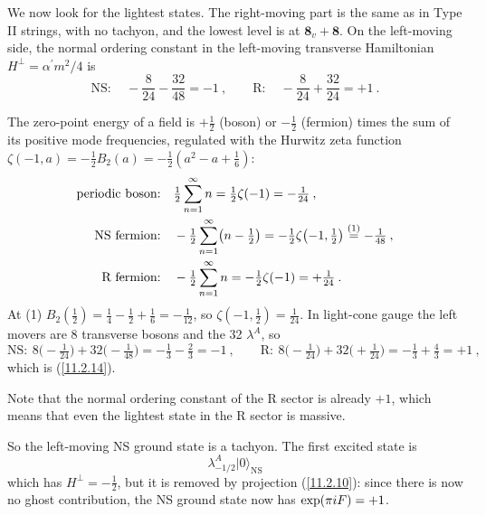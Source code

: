 We now look for the lightest states. The right-moving part is the same as in Type II strings, with no tachyon, and the lowest level is at $\mathbf{8}_{v}+\mathbf{8}$. On the left-moving side, the normal ordering constant in the left-moving transverse Hamiltonian $H^{\bot}=\alpha^{\prime}m^{2}/4$ is
\begin{equation}
	\text{NS}:\quad -\frac{8}{24}-\frac{32}{48} =-1\:, \qquad \text{R}:\quad -\frac{8}{24}+\frac{32}{24}=+1\:.\label{11.2.14} 
\end{equation}
\begin{tcolorbox}[breakable]
	\begin{remark}
		The zero-point energy of a field is $+\frac{1}{2}$ (boson) or $-\frac{1}{2}$ (fermion) times the sum of its positive mode frequencies, regulated with the Hurwitz zeta function $\zeta(-1,a)=-\frac{1}{2}B_{2}(a)=-\frac{1}{2}(a^{2}-a+\frac{1}{6})$:
		\begin{align*}
			\text{periodic boson:}&\quad \tfrac{1}{2}\sum_{n=1}^{\infty}n=\tfrac{1}{2}\zeta(-1)=-\tfrac{1}{24}\:,\\
			\text{NS fermion:}&\quad -\tfrac{1}{2}\sum_{n=1}^{\infty}\bigl(n-\tfrac{1}{2}\bigr)=-\tfrac{1}{2}\zeta\bigl(-1,\tfrac{1}{2}\bigr)\overset{(1)}{=}-\tfrac{1}{48}\:,\\
			\text{R fermion:}&\quad -\tfrac{1}{2}\sum_{n=1}^{\infty}n=-\tfrac{1}{2}\zeta(-1)=+\tfrac{1}{24}\:.
		\end{align*}
		At (1) $B_{2}(\frac{1}{2})=\frac{1}{4}-\frac{1}{2}+\frac{1}{6}=-\frac{1}{12}$, so $\zeta(-1,\frac{1}{2})=\frac{1}{24}$. In light-cone gauge the left movers are 8 transverse bosons and the 32 $\lambda^{A}$, so
		\begin{equation*}
			\text{NS}:\ 8\bigl(-\tfrac{1}{24}\bigr)+32\bigl(-\tfrac{1}{48}\bigr)=-\tfrac{1}{3}-\tfrac{2}{3}=-1\:,\qquad
			\text{R}:\ 8\bigl(-\tfrac{1}{24}\bigr)+32\bigl(+\tfrac{1}{24}\bigr)=-\tfrac{1}{3}+\tfrac{4}{3}=+1\:,
		\end{equation*}
		which is (\ref{11.2.14}).
	\end{remark}
	Note that the normal ordering constant of the R sector is already $+1$, which means that even the lightest state in the R sector is massive.
\end{tcolorbox}
\noindent So the left-moving NS ground state is a tachyon. The first excited state is
\begin{equation}
	\lambda^{A}_{-1/2}\lvert 0\rangle_{\text{NS}}  \label{11.2.15}
\end{equation}
which has $H^{\bot}=-\frac{1}{2}$, but it is removed by projection (\ref{11.2.10}): since there is now no ghost contribution, the NS ground state now has $\exp(\pi i F)=+1$.

